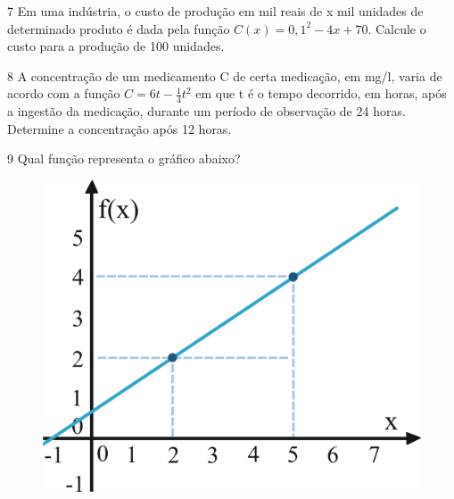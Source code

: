 \num{7} Em uma indústria, o custo de produção em mil reais de x mil unidades
de determinado produto é dada pela função $ C(x) = 0,1^2 - 4x + 70$. Calcule 
o custo para a produção de 100 unidades.



\num{8} A concentração de um medicamento C de certa medicação, em mg/l, varia de
acordo com a função $C = 6t - \frac{1}{4} t^2$ em que t é o tempo decorrido, em 
horas, após a ingestão da medicação, durante um período de observação de 24 horas.
Determine a concentração após 12 horas.

\begin{emptybox}
\end{emptybox}

\num{9} Qual função representa o gráfico abaixo?

\begin{figure}[htpb!]
\centering
\includegraphics[width=.65\textwidth]{./ilustras-mat/modulo_9-atividade_9.png}
\end{figure}

\begin{emptybox}
\end{emptybox}

